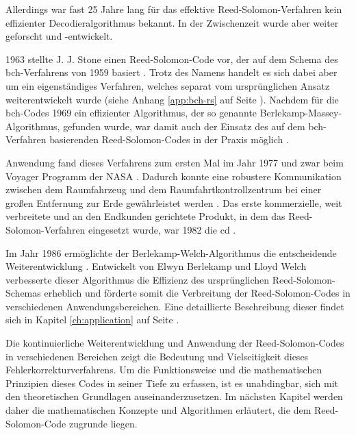 Allerdings war fast 25 Jahre lang für das effektive Reed-Solomon-Verfahren kein effizienter Decodier\-algorithmus bekannt.
In der Zwischenzeit wurde aber weiter geforscht und -entwickelt.

1963 stellte J. J. Stone einen Reed-Solomon-Code vor, der auf dem Schema des \acrfull{bch}-Verfahrens von 1959 basiert \cite{petersonErrorcorrectingCodes1972}.
Trotz des Namens handelt es sich dabei aber um ein eigenständiges Verfahren, welches separat vom ursprünglichen Ansatz weiterentwickelt wurde (siehe Anhang \ref{app:bch-rs} auf Seite \pageref{app:bch-rs}).
Nachdem für die \acrshort{bch}-Codes 1969 ein effizienter Algorithmus, der so genannte Berlekamp-Massey-Algorithmus, gefunden wurde, war damit auch der Einsatz des auf dem \acrshort{bch}-Verfahren basierenden Reed-Solomon-Codes in der Praxis möglich \cite{berlekampNonbinaryBCHDecoding1968, masseyShiftregisterSynthesisBCH1969}.

Anwendung fand dieses Verfahrens zum ersten Mal im Jahr 1977 und zwar beim Voyager Programm der NASA \cite{wickerReedSolomonCodes1994}. 
Dadurch konnte eine robustere Kommunikation zwischen dem Raumfahrzeug und dem Raumfahrtkontrollzentrum bei einer großen Entfernung zur Erde gewährleistet werden \cite{ludwigVoyagerTelecommunications2002}.
Das erste kommerzielle, weit verbreitete und an den Endkunden gerichtete Produkt, in dem das Reed-Solomon-Verfahren eingesetzt wurde, war 1982 die \acrfull{cd} \cite{changReedSolomonProductCodeRSPC1998}.

Im Jahr 1986 ermöglichte der Berlekamp-Welch-Algorithmus die entscheidende Weiterentwicklung \cite{wendlingIntroductionReedSolomon2017}.
Entwickelt von Elwyn Berlekamp und Lloyd Welch verbesserte dieser Algorithmus die Effizienz des ursprünglichen Reed-Solomon-Schemas erheblich und förderte somit die Verbreitung der Reed-Solomon-Codes in verschiedenen Anwendungsbereichen. 
Eine detaillierte Beschreibung dieser findet sich in Kapitel \ref{ch:application} auf Seite \pageref{ch:application}.

Die kontinuierliche Weiterentwicklung und Anwendung der Reed-Solomon-Codes in verschiedenen Bereichen zeigt die Bedeutung und Vielseitigkeit dieses Fehlerkorrekturverfahrens. 
Um die Funktionsweise und die mathematischen Prinzipien dieses Codes in seiner Tiefe zu erfassen, ist es unabdingbar, sich mit den theoretischen Grundlagen auseinanderzusetzen. 
Im nächsten Kapitel werden daher die mathematischen Konzepte und Algorithmen erläutert, die dem Reed-Solomon-Code zugrunde liegen.